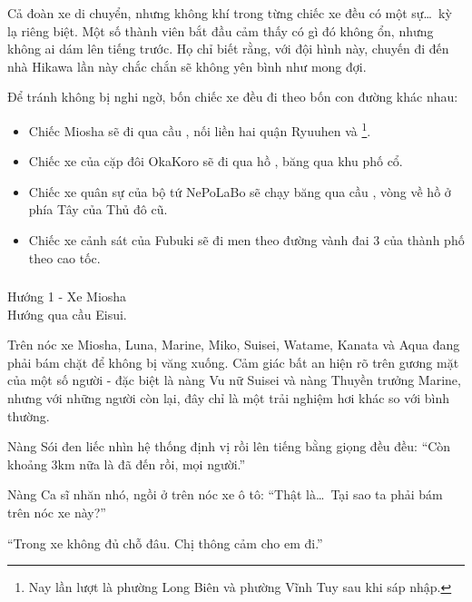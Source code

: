 \documentclass[../main.tex]{subfiles}
\begin{document}
Cả đoàn xe di chuyển, nhưng không khí trong từng chiếc xe đều có một sự\dots\ kỳ lạ riêng biệt. Một số thành viên bắt đầu cảm thấy có gì đó không ổn, nhưng không ai dám lên tiếng trước. Họ chỉ biết rằng, với đội hình này, chuyến đi đến nhà Hikawa lần này chắc chắn sẽ không yên bình như mong đợi.

Để tránh không bị nghi ngờ, bốn chiếc xe đều đi theo bốn con đường khác nhau:

\begin{itemize}
    \item Chiếc Miosha sẽ đi qua cầu , nối liền hai quận Ryuuhen và \footnote{Nay lần lượt là phường Long Biên và phường Vĩnh Tuy sau khi sáp nhập.}.
    \item Chiếc xe của cặp đôi OkaKoro sẽ đi qua hồ , băng qua khu phố cổ.
    \item Chiếc xe quân sự của bộ tứ NePoLaBo sẽ chạy băng qua cầu , vòng về hồ ở phía Tây của Thủ đô cũ.
    \item Chiếc xe cảnh sát của Fubuki sẽ đi men theo đường vành đai 3 của thành phố theo cao tốc.
\end{itemize}

\il

\subsubsection*{\label{P1.1a}}

\begin{center}
    {\color{T1} Hướng 1 - Xe Miosha}\\Hướng qua cầu Eisui.
\end{center}

Trên nóc xe Miosha, Luna, Marine, Miko, Suisei, Watame, Kanata và Aqua đang phải bám chặt để không bị văng xuống. Cảm giác bất an hiện rõ trên gương mặt của một số người - đặc biệt là nàng Vu nữ Suisei và nàng Thuyền trưởng Marine, nhưng với những người còn lại, đây chỉ là một trải nghiệm hơi khác so với bình thường.

Nàng Sói đen liếc nhìn hệ thống định vị rồi lên tiếng bằng giọng đều đều: ``Còn khoảng 3km nữa là đã đến rồi, mọi người.''

Nàng Ca sĩ nhăn nhó, ngồi ở trên nóc xe ô tô: ``Thật là\dots\ Tại sao ta phải bám trên nóc xe này?''

``Trong xe không đủ chỗ đâu. Chị thông cảm cho em đi.''
\end{document}
